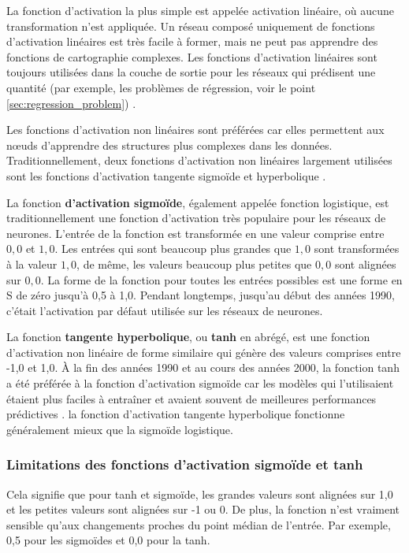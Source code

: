 	La fonction d'activation la plus simple est appelée activation linéaire, où aucune transformation n'est appliquée. Un réseau composé uniquement de fonctions d'activation linéaires est très facile à former, mais ne peut pas apprendre des fonctions de cartographie complexes. Les fonctions d'activation linéaires sont toujours utilisées dans la couche de sortie pour les réseaux qui prédisent une quantité (par exemple, les problèmes de régression, voir le point \ref{sec:regression_problem}) \cite{geron2017hands}.
	
	Les fonctions d'activation non linéaires sont préférées car elles permettent aux nœuds d'apprendre des structures plus complexes dans les données. Traditionnellement, deux fonctions d'activation non linéaires largement utilisées sont les fonctions d'activation tangente sigmoïde et hyperbolique \cite{goodfellow2016deep}.
	
	La fonction \textbf{d'activation sigmoïde}, également appelée fonction logistique, est traditionnellement une fonction d'activation très populaire pour les réseaux de neurones. L'entrée de la fonction est transformée en une valeur comprise entre $0,0$ et $1,0$. Les entrées qui sont beaucoup plus grandes que $1,0$ sont transformées à la valeur $1,0$, de même, les valeurs beaucoup plus petites que $0,0$ sont alignées sur $0,0$. La forme de la fonction pour toutes les entrées possibles est une forme en S de zéro jusqu'à 0,5 à 1,0. Pendant longtemps, jusqu'au début des années 1990, c'était l'activation par défaut utilisée sur les réseaux de neurones.
	
	
	La fonction \textbf{tangente hyperbolique}, ou \textbf{tanh} en abrégé, est une fonction d'activation non linéaire de forme similaire qui génère des valeurs comprises entre -1,0 et 1,0. À la fin des années 1990 et au cours des années 2000, la fonction tanh a été préférée à la fonction d'activation sigmoïde car les modèles qui l'utilisaient étaient plus faciles à entraîner et avaient souvent de meilleures performances prédictives \cite{goodfellow2016deep}.
	la fonction d'activation tangente hyperbolique fonctionne généralement mieux que la sigmoïde logistique.
	\subsubsection*{Limitations des fonctions d'activation sigmoïde et tanh}
	Cela signifie que pour tanh et sigmoïde, les grandes valeurs sont alignées sur 1,0 et les petites valeurs sont alignées sur -1 ou 0. De plus, la fonction n'est vraiment sensible qu'aux changements proches du point médian de l'entrée. Par exemple, 0,5 pour les sigmoïdes et 0,0 pour la tanh.
	
